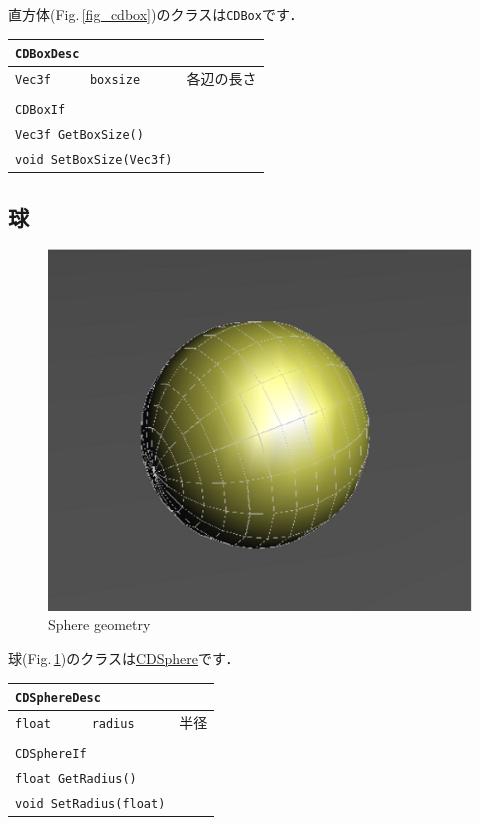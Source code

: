 \KLUDGE 直方体(Fig.\,\ref{fig_cdbox})のクラスは\texttt{CDBox}です．

\begin{center}
\begin{tabular}{lll}
\multicolumn{3}{l}{\texttt{CDBoxDesc}}					\\ \midrule
\texttt{Vec3f}	&	\texttt{boxsize}	& 各辺の長さ 	\\
\\
\multicolumn{3}{l}{\texttt{CDBoxIf}}					\\ \midrule
\multicolumn{2}{l}{\texttt{Vec3f GetBoxSize()}}			\\
\multicolumn{2}{l}{\texttt{void SetBoxSize(Vec3f)}}		\\
\end{tabular}
\end{center}


\subsection*{球}

\begin{figure}[t]
\begin{center}
\includegraphics[width=.4\hsize]{fig/cdsphere.eps}
\end{center}
\caption{Sphere geometry}
\label{fig_cdsphere}
\end{figure}

\KLUDGE 球(Fig.\,\ref{fig_cdsphere})のクラスは\url{CDSphere}です．

\begin{center}
\begin{tabular}{lll}
\multicolumn{3}{l}{\texttt{CDSphereDesc}}				\\ \midrule
\texttt{float}	&	\texttt{radius}	& 半径 				\\
\\
\multicolumn{3}{l}{\texttt{CDSphereIf}}					\\ \midrule
\multicolumn{2}{l}{\texttt{float GetRadius()}}			\\
\multicolumn{2}{l}{\texttt{void SetRadius(float)}}		\\
\end{tabular}
\end{center}


